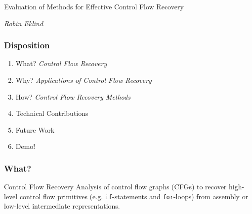 \documentclass[aspectratio=1610]{beamer}
\begin{document}


\startpage

\begin{frame}
	\vspace{0.02\textheight}

	\begin{Large}
		Evaluation of Methods for Effective Control Flow Recovery
	\end{Large}

	\vspace{0.1\textheight}

	\begin{small}
		\textit{Robin Eklind}
	\end{small}
\end{frame}


\normalpage

\begin{frame}
	\frametitle{Disposition}

	\begin{enumerate}
		\item What? \textit{Control Flow Recovery}
		\item Why? \textit{Applications of Control Flow Recovery}
		\item How? \textit{Control Flow Recovery Methods}
		\item Technical Contributions
		\item Future Work
		\item Demo!
	\end{enumerate}
\end{frame}







\begin{frame}
	\frametitle{What?}

	\begin{block}{Control Flow Recovery}
		Analysis of control flow graphs (CFGs) to recover high-level control flow primitives (e.g. \texttt{if}-statements and \texttt{for}-loops) from assembly or low-level intermediate representations.
	\end{block}
\end{frame}
\end{document}

